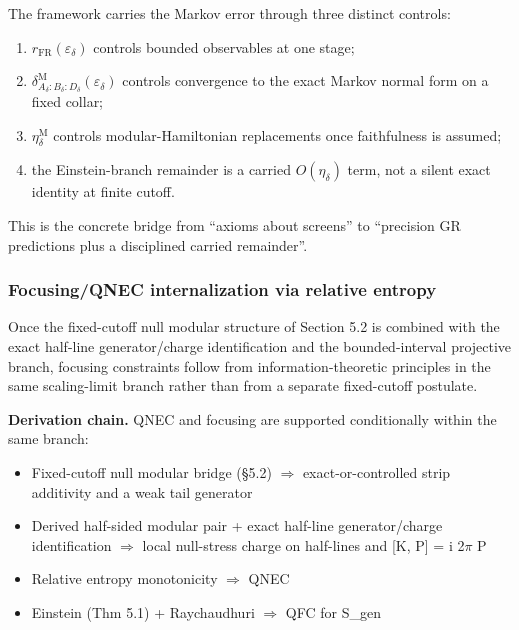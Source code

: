 The framework carries the Markov error through three distinct controls:
\begin{enumerate}
\def\labelenumi{\arabic{enumi}.}
\tightlist
\item
\(r_{\mathrm{FR}}(\varepsilon_\delta)\) controls bounded observables at one stage;
\item
\(\delta^{\mathrm M}_{A_\delta:B_\delta:D_\delta}(\varepsilon_\delta)\) controls convergence to the exact Markov normal form on a fixed collar;
\item
\(\eta_\delta^{\mathrm M}\) controls modular-Hamiltonian replacements once faithfulness is assumed;
\item
the Einstein-branch remainder is a carried \(O(\eta_\delta)\) term, not a silent exact identity at finite cutoff.
\end{enumerate}

This is the concrete bridge from ``axioms about screens'' to ``precision GR predictions plus a disciplined carried remainder''.

\subsubsection{Focusing/QNEC internalization via relative entropy}\label{510-focusingqnec-internalization-via-relative-entropy}

Once the fixed-cutoff null modular structure of Section 5.2 is combined with the exact half-line generator/charge identification and the bounded-interval projective branch, focusing constraints follow from information-theoretic principles in the same scaling-limit branch rather than from a separate fixed-cutoff postulate.

\textbf{Derivation chain.} QNEC and focusing are supported conditionally within the same branch:

\begin{itemize}
\tightlist
\item
  Fixed-cutoff null modular bridge (\S{}5.2) \ensuremath{\Longrightarrow} exact-or-controlled strip additivity and a weak tail generator
\item
  Derived half-sided modular pair + exact half-line generator/charge identification \ensuremath{\Longrightarrow} local null-stress charge on half-lines and {[}K, P{]} = i 2\ensuremath{\pi} P
\item
  Relative entropy monotonicity \ensuremath{\Longrightarrow} QNEC
\item
  Einstein (Thm 5.1) + Raychaudhuri \ensuremath{\Longrightarrow} QFC for S\_gen
\end{itemize}

